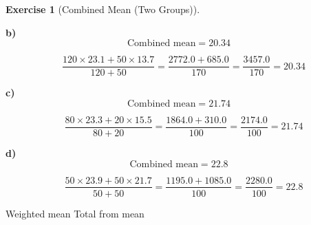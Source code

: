 \documentclass[
  letterpaper,
  DIV=11,
  numbers=noendperiod]{scrreprt}
\theoremstyle{definition}
\newtheorem{exercise}{Exercise}[chapter]
\theoremstyle{remark}
\begin{document}
\begin{exercise}[Combined Mean (Two
Groups)]
\begin{tcolorbox}
\textbf{b)} \[\text{Combined mean} = 20.34\]

\[\quad \frac{120\times23.1+50\times13.7}{120+50}=\frac{2772.0+685.0}{170}=\frac{3457.0}{170}=20.34\]

\textbf{c)} \[\text{Combined mean} = 21.74\]

\[\quad \frac{80\times23.3+20\times15.5}{80+20}=\frac{1864.0+310.0}{100}=\frac{2174.0}{100}=21.74\]

\textbf{d)} \[\text{Combined mean} = 22.8\]

\[\quad \frac{50\times23.9+50\times21.7}{50+50}=\frac{1195.0+1085.0}{100}=\frac{2280.0}{100}=22.8\]

\end{tcolorbox}

{Weighted mean} {Total from mean}

\end{exercise}
\end{document}

